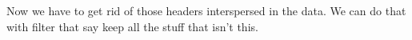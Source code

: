 \documentclass[
]{book}
\newenvironment{Shaded}{\begin{snugshade}}{\end{snugshade}}
\newcommand{\DataTypeTok}[1]{\textcolor[rgb]{0.13,0.29,0.53}{#1}}
\newcommand{\KeywordTok}[1]{\textcolor[rgb]{0.13,0.29,0.53}{\textbf{#1}}}
\newcommand{\NormalTok}[1]{#1}
\newcommand{\OperatorTok}[1]{\textcolor[rgb]{0.81,0.36,0.00}{\textbf{#1}}}
\newcommand{\StringTok}[1]{\textcolor[rgb]{0.31,0.60,0.02}{#1}}
\begin{document}
\begin{Shaded}
\end{Shaded}

Now we have to get rid of those headers interspersed in the data. We can do that with filter that say keep all the stuff that isn't this.

\begin{Shaded}
\end{Shaded}
\end{document}
